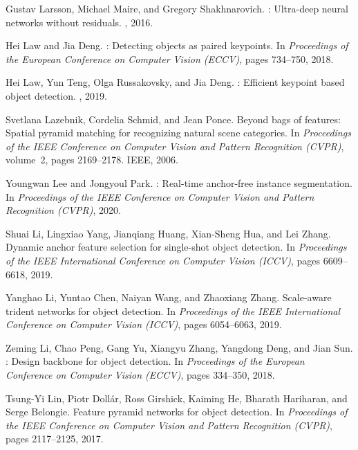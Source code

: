 \documentclass[10pt,twocolumn,letterpaper]{article}
\begin{document}
{\begin{thebibliography}{100}
	Gustav Larsson, Michael Maire, and Gregory Shakhnarovich.
	: Ultra-deep neural networks without residuals.
	, 2016.
	
	Hei Law and Jia Deng.
	: Detecting objects as paired keypoints.
	\newblock In {\em Proceedings of the European Conference on Computer Vision
		(ECCV)}, pages 734--750, 2018.
	
	Hei Law, Yun Teng, Olga Russakovsky, and Jia Deng.
	: Efficient keypoint based object detection.
	, 2019.
	
	Svetlana Lazebnik, Cordelia Schmid, and Jean Ponce.
	\newblock Beyond bags of features: Spatial pyramid matching for recognizing
	natural scene categories.
	\newblock In {\em Proceedings of the IEEE Conference on Computer Vision and
		Pattern Recognition (CVPR)}, volume~2, pages 2169--2178. IEEE, 2006.
	
	Youngwan Lee and Jongyoul Park.
	: Real-time anchor-free instance segmentation.
	\newblock In {\em Proceedings of the IEEE Conference on Computer Vision and
		Pattern Recognition (CVPR)}, 2020.
	
	Shuai Li, Lingxiao Yang, Jianqiang Huang, Xian-Sheng Hua, and Lei Zhang.
	\newblock Dynamic anchor feature selection for single-shot object detection.
	\newblock In {\em Proceedings of the IEEE International Conference on Computer
		Vision (ICCV)}, pages 6609--6618, 2019.
	
	Yanghao Li, Yuntao Chen, Naiyan Wang, and Zhaoxiang Zhang.
	\newblock Scale-aware trident networks for object detection.
	\newblock In {\em Proceedings of the IEEE International Conference on Computer
		Vision (ICCV)}, pages 6054--6063, 2019.
	
	Zeming Li, Chao Peng, Gang Yu, Xiangyu Zhang, Yangdong Deng, and Jian Sun.
	: Design backbone for object detection.
	\newblock In {\em Proceedings of the European Conference on Computer Vision
		(ECCV)}, pages 334--350, 2018.
	
	Tsung-Yi Lin, Piotr Doll{\'a}r, Ross Girshick, Kaiming He, Bharath Hariharan,
	and Serge Belongie.
	\newblock Feature pyramid networks for object detection.
	\newblock In {\em Proceedings of the IEEE Conference on Computer Vision and
		Pattern Recognition (CVPR)}, pages 2117--2125, 2017.
	

\end{thebibliography}}
\end{document}
